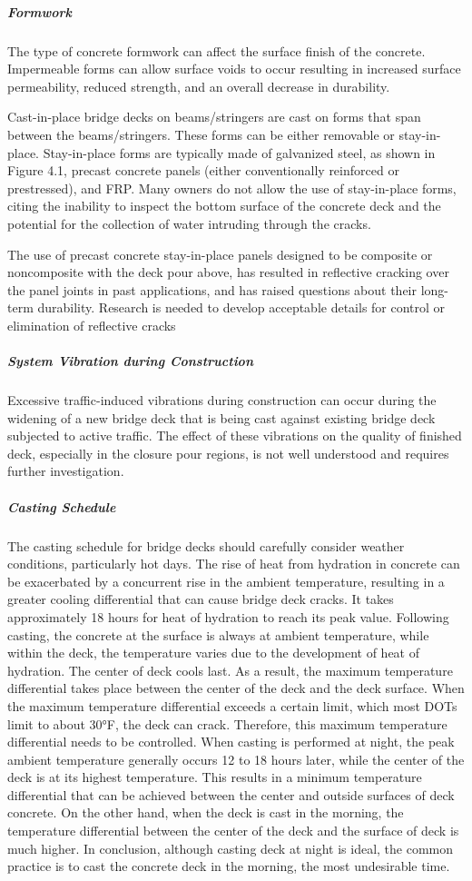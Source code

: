 \subparagraph{Formwork}
The type of concrete formwork can affect the surface finish of the concrete. Impermeable forms can allow
surface voids to occur resulting in increased surface permeability, reduced strength, and an overall decrease in
durability.

Cast-in-place bridge decks on beams/stringers are cast on forms that span between the beams/stringers. These
forms can be either removable or stay-in-place. Stay-in-place forms are typically made of galvanized steel, as shown
in Figure 4.1, precast concrete panels (either conventionally reinforced or prestressed), and FRP. Many owners do
not allow the use of stay-in-place forms, citing the inability to inspect the bottom surface of the concrete deck and the
potential for the collection of water intruding through the cracks.

The use of precast concrete stay-in-place panels designed to be composite or noncomposite with the deck pour
above, has resulted in reflective cracking over the panel joints in past applications, and has raised questions about
their long-term durability. Research is needed to develop acceptable details for control or elimination of reflective
cracks

\subparagraph{System Vibration during Construction}
Excessive traffic-induced vibrations during construction can occur during the widening of a new bridge deck
that is being cast against existing bridge deck subjected to active traffic. The effect of these vibrations on the quality
of finished deck, especially in the closure pour regions, is not well understood and requires further investigation.

\subparagraph{Casting Schedule}
The casting schedule for bridge decks should carefully consider weather conditions, particularly hot days. The
rise of heat from hydration in concrete can be exacerbated by a concurrent rise in the ambient temperature, resulting
in a greater cooling differential that can cause bridge deck cracks. It takes approximately 18 hours for heat of
hydration to reach its peak value. Following casting, the concrete at the surface is always at ambient temperature,
while within the deck, the temperature varies due to the development of heat of hydration. The center of deck cools
last. As a result, the maximum temperature differential takes place between the center of the deck and the deck
surface. When the maximum temperature differential exceeds a certain limit, which most DOTs limit to about 30°F,
the deck can crack. Therefore, this maximum temperature differential needs to be controlled. When casting is
performed at night, the peak ambient temperature generally occurs 12 to 18 hours later, while the center of the deck
is at its highest temperature. This results in a minimum temperature differential that can be achieved between the
center and outside surfaces of deck concrete. On the other hand, when the deck is cast in the morning, the
temperature differential between the center of the deck and the surface of deck is much higher. In conclusion,
although casting deck at night is ideal, the common practice is to cast the concrete deck in the morning, the most
undesirable time.

